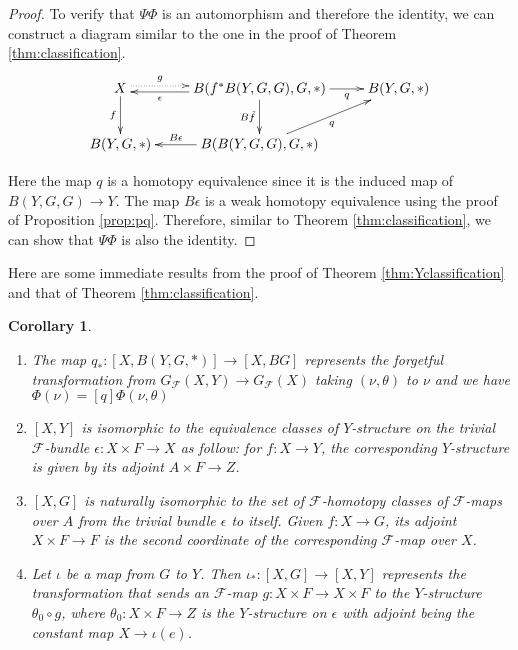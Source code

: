 \documentclass[psamsfonts]{amsart}
\newtheorem{cor}[thm]{Corollary}
\theoremstyle{definition}
\theoremstyle{remark}
\numberwithin{equation}{section}
\begin{document}
\begin{proof}
To verify that $\Psi\Phi$ is an automorphism and therefore the identity, we can construct a diagram similar to the one in the proof of Theorem \ref{thm:classification}.
\[\xymatrix{
X \ar@{.>}[r]<.5ex>^-{g} \ar[d]_-{f} & B(f^{*}B(Y, G, G), G, *) \ar[l]<.5ex>^-{\epsilon}  \ar[d]_-{B\tilde{f}} \ar[r]_-{q} & B(Y, G, *)\\
B(Y, G, *) & B(B(Y, G, G), G, *) \ar[l]_-{B\epsilon} \ar[ur]_-{q}\\
} \]

Here the map $q$ is a homotopy equivalence since it is the induced map of $B(Y, G, G) \to Y$. The map $B\epsilon$ is a weak homotopy equivalence using the proof of Proposition \ref{prop:pq}. Therefore, similar to Theorem \ref{thm:classification}, we can show that $\Psi\Phi$ is also the identity.
\end{proof}

Here are some immediate results from the proof of Theorem \ref{thm:Yclassification} and that of Theorem \ref{thm:classification}.

\begin{cor}
\leavevmode
\begin{enumerate}
\item The map $q_{*}: [X, B(Y, G, *)] \to [X, BG]$ represents the forgetful transformation from $G_{\mathcal{F}}(X, Y) \to G_{\mathcal{F}}(X)$ taking $(\nu, \theta)$ to $\nu$ and we have $\Phi(\nu) = [q]\Phi{(\nu, \theta)}$
\item $[X,Y]$ is isomorphic to the equivalence classes of $Y$-structure on the trivial $\mathcal{F}$-bundle $\epsilon: X \times F \to X$ as follow: for $f: X \to Y$, the corresponding $Y$-structure is given by its adjoint $A \times F \to Z$.
\item $[X, G]$ is naturally isomorphic to the set of $\mathcal{F}$-homotopy classes of $\mathcal{F}$-maps over $A$ from the trivial bundle $\epsilon$ to itself. Given $f: X \to G$, its adjoint $X \times F \to F$ is the second coordinate of the corresponding $\mathcal{F}$-map over $X$.
\item Let $\iota$ be a map from $G$ to $Y$. Then $\iota_{*}: [X, G] \to [X, Y]$ represents the transformation that sends an $\mathcal{F}$-map $g: X \times F \to X \times F$ to the $Y$-structure $\theta_{0} \circ g$, where $\theta_{0}: X \times F \to Z$ is the $Y$-structure on $\epsilon$ with adjoint being the constant map $X \to \iota(e)$. 
\end{enumerate}

\end{cor}
\end{document}
